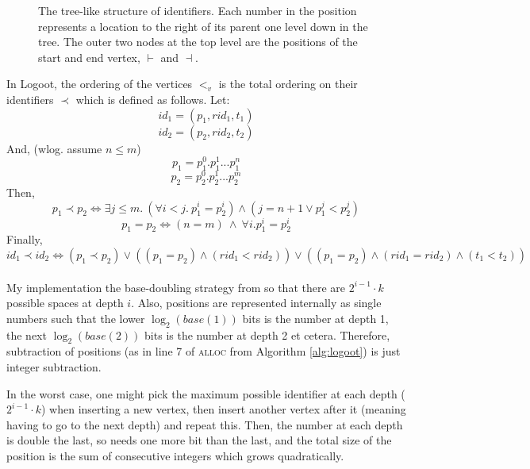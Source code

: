 \documentclass[diss.tex]{subfiles}
\begin{document}
\begin{figure}[H]
\centering
{}
\caption{The tree-like structure of identifiers. Each number in the position represents a location to the right of its parent one level down in the tree. The outer two nodes at the top level are the positions of the start and end vertex, $\vdash$ and $\dashv$.}
\label{fig:tree}
\end{figure}
%
%
%
%
\noindent
In Logoot, the ordering of the vertices $<_v$ is the total ordering on their identifiers $\prec$ \cite{logoot} which is defined as follows. 
Let: $$id_1 = (p_1, rid_1, t_1)$$ $$id_2 = (p_2, rid_2, t_2)$$
And, (wlog. assume $n \leq m$)
$$ p_1 = p_1^0.p_1^1...p_1^n$$ $$p_2 = p_2^0.p_2^1...p_2^m$$
Then, 
$$ p_1 \prec p_2 \Leftrightarrow \exists j \leq m.~ (\forall i<j.~ p_1^i = p_2^i) \wedge (j=n+1 \vee p_1^j < p_2^j)$$
$$ p_1 = p_2 \Leftrightarrow (n=m)~ \wedge~ \forall i. p_1^i = p_2^i$$
Finally, $$id_1 \prec id_2 \Leftrightarrow (p_1 \prec p_2) \vee ((p_1 = p_2) \wedge (rid_1 < rid_2)) \vee ((p_1 = p_2) \wedge (rid_1 = rid_2) \wedge (t_1 < t_2))$$
\\
My implementation the base-doubling strategy from \cite{logoot} so that there are $2^{i-1} \cdot k$ possible spaces at depth $i$. Also, positions are represented internally as single numbers such that the lower $\log_2(base(1))$ bits is the number at depth 1, the next $\log_2(base(2))$ bits is the number at depth 2 et cetera. Therefore, subtraction of positions (as in line 7 of \textsc{alloc} from Algorithm \ref{alg:logoot}) is just integer subtraction.

In the worst case, one might pick the maximum possible identifier at each depth ($2^{i-1} \cdot k$) when inserting a new vertex, then insert another vertex after it (meaning having to go to the next depth) and repeat this. Then, the number at each depth is double the last, so needs one more bit than the last, and the total size of the position is the sum of consecutive integers which grows quadratically.
\end{document}
